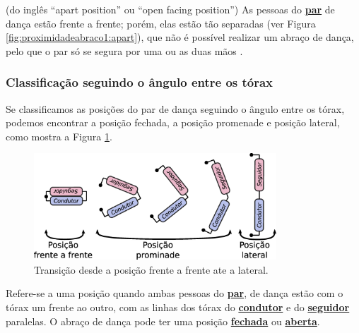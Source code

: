 \begin{definition}
\label{def:apart-position} (do inglês ``apart position'' ou ``open facing position'') 
As pessoas do \hyperref[def:Par]{\textbf{par}} de dança estão frente a frente;
porém, elas estão tão separadas (ver Figura \ref{fig:proximidadeabraco1:apart}), 
que não é possível realizar um abraço de dança, 
pelo que o par só se segura por uma ou as duas mãos \cite{fletsher2015improve} \cite[pp. 14]{BallroomDancing1992}.
\end{definition}

\subsubsection{Classificação seguindo o ângulo entre os tórax}
Se classificamos as posições do par de dança seguindo o ângulo entre os tórax,
podemos encontrar a posição fechada, 
a posição promenade e posição lateral, como mostra a Figura \ref{fig:desenhando}.
\begin{figure}[!ht]
     \centering
\includegraphics[width=0.81\textwidth]{chapters/cap-normas/desenhando.eps}
\caption{Transição desde a posição frente a frente ate a lateral.}
\label{fig:desenhando}
\end{figure}


\begin{definition}
\label{def:frente-frente-position} 
Refere-se a uma posição quando ambas pessoas do \hyperref[def:Par]{\textbf{par}}, 
de dança estão com o tórax um frente ao outro,
com as linhas dos tórax do 
\hyperref[def:Condutor]{\textbf{condutor}} e do
\hyperref[def:Seguidor]{\textbf{seguidor}} paralelas.
O abraço de dança pode ter uma posição \hyperref[def:closed-position]{\textbf{fechada}} 
ou \hyperref[def:open-position]{\textbf{aberta}}.
\end{definition}




